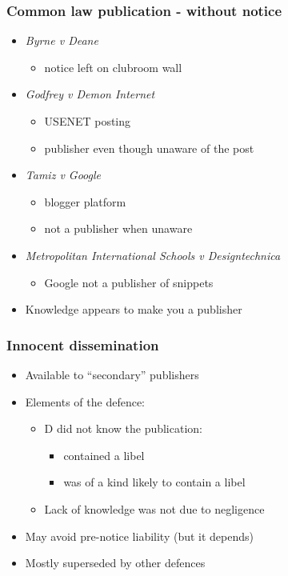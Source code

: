 \documentclass[ignorenonframetext,]{beamer}
\begin{document}
\begin{frame}
\frametitle{Common law publication - without notice}
  \begin{itemize}
    \item {\it Byrne v Deane}
      \begin{itemize}
      \item notice left on clubroom wall
      \end{itemize}
    \item {\it Godfrey v Demon Internet}
      \begin{itemize}
      \item USENET posting
      \item publisher even though unaware of the post
      \end{itemize}
    \item {\it Tamiz v Google}
      \begin{itemize}
      \item blogger platform
      \item not a publisher when unaware
      \end{itemize}
    \item {\it Metropolitan International Schools v Designtechnica}
      \begin{itemize}
      \item Google not a publisher of snippets
      \end{itemize}
    \item Knowledge appears to make you a publisher
  \end{itemize}
 
\end{frame}


\begin{frame}
  \frametitle{Innocent dissemination}
  \begin{itemize}
  \item Available to ``secondary'' publishers
  \item Elements of the defence:
    \begin{itemize}
    \item D did not know the publication:
      \begin{itemize}
      \item contained a libel
      \item was of a kind likely to contain a libel
      \end{itemize}
    \item Lack of knowledge was not due to negligence
    \end{itemize}
  \item May avoid pre-notice liability (but it depends)
  \item Mostly superseded by other defences
  \end{itemize}
\end{frame}
\end{document}
